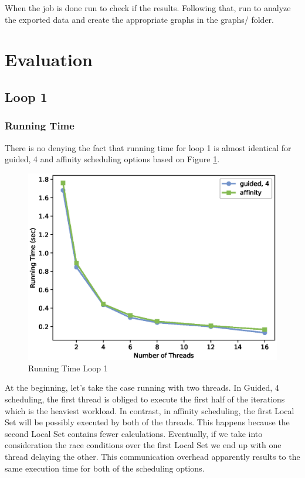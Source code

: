 \documentclass[12pt,a4paper]{article}
\begin{document}
When the job is done run  to check if the results. Following that, run  to analyze the exported data and create the appropriate graphs in the graphs/ folder.

\section{Evaluation}

\subsection{Loop 1}

\subsubsection{Running Time}

There is no denying the fact that running time for loop 1 is almost identical for guided, 4 and affinity scheduling options based on Figure \ref{runningTimeLoop1}.

\begin{figure}[h!]
	\centering
	\includegraphics[scale=0.6]{../graphs/loop1_running_time.eps}
	\caption{Running Time Loop 1}
	\label{runningTimeLoop1}
\end{figure}

At the beginning, let's take the case running with two threads. In Guided, 4 scheduling, the first thread is obliged to execute the first half of the iterations which is the heaviest workload. In contrast, in affinity scheduling, the first Local Set will be possibly executed by both of the threads. This happens because the second Local Set contains fewer calculations. Eventually, if we take into consideration the race conditions over the first Local Set we end up with one thread delaying the other. This communication overhead apparently results to the same execution time for both of the scheduling options.
\end{document}
